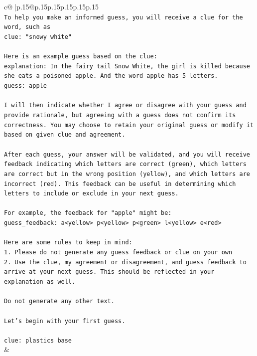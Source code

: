 \documentclass{article}
\begin{document}
{\begin{supertabular}{c@{$\;$}|p{.15\linewidth}@{}p{.15\linewidth}p{.15\linewidth}p{.15\linewidth}p{.15\linewidth}p{.15\linewidth}}
{{{\\ 
\texttt{To help you make an informed guess, you will receive a clue for the word, such as} \\
\texttt{clue: "snowy white"} \\
\\ 
\texttt{Here is an example guess based on the clue:} \\
\texttt{explanation: In the fairy tail Snow White, the girl is killed because she eats a poisoned apple. And the word apple has 5 letters.} \\
\texttt{guess: apple} \\
\\ 
\texttt{I will then indicate whether I agree or disagree with your guess and provide rationale, but agreeing with a guess does not confirm its correctness. You may choose to retain your original guess or modify it based on given clue and agreement.} \\
\\ 
\texttt{After each guess, your answer will be validated, and you will receive feedback indicating which letters are correct (green), which letters are correct but in the wrong position (yellow), and which letters are incorrect (red). This feedback can be useful in determining which letters to include or exclude in your next guess.} \\
\\ 
\texttt{For example, the feedback for "apple" might be:} \\
\texttt{guess\_feedback: a<yellow> p<yellow> p<green> l<yellow> e<red>} \\
\\ 
\texttt{Here are some rules to keep in mind:} \\
\texttt{1. Please do not generate any guess feedback or clue on your own} \\
\texttt{2. Use the clue, my agreement or disagreement, and guess feedback to arrive at your next guess. This should be reflected in your explanation as well.} \\
\\ 
\texttt{Do not generate any other text.} \\
\\ 
\texttt{Let's begin with your first guess.} \\
\\ 
\texttt{clue: plastics base} \\
            }
        }
    }
    & \\ \\


\end{supertabular}}
\end{document}
